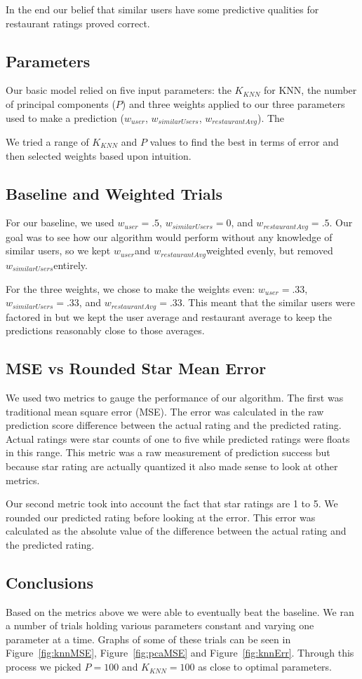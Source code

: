 \documentclass[10pt,twocolumn,letterpaper]{article}
\newcommand{\wu}{\ensuremath{w_{user}}}
\newcommand{\ws}{\ensuremath{w_{similarUsers}}}
\newcommand{\wrst}{\ensuremath{w_{restaurantAvg}}}
\begin{document}
In the end our belief that similar users have some predictive qualities for restaurant ratings proved correct.

\subsection{Parameters}
Our basic model relied on five input parameters: the $K_{KNN}$ for KNN, the number of principal components ($P$) and three weights applied to our three parameters used to make a prediction (\wu, \ws, \wrst). The 

We tried a range of $K_{KNN}$ and $P$ values to find the best in terms of error and then selected weights based upon intuition.

\subsection{Baseline and Weighted Trials}

For our baseline, we used $\wu=.5$, $\ws=0$, and $\wrst=.5$. Our goal was to see how our algorithm would perform without any knowledge of similar users, so we kept \wu and \wrst weighted evenly, but removed \ws entirely.

For the three weights, we chose to make the weights even: $\wu=.33$, $\ws=.33$, and $\wrst=.33$. This meant that the similar users were factored in but we kept the user average and restaurant average to keep the predictions reasonably close to those averages.

\subsection{MSE vs Rounded Star Mean Error}
We used two metrics to gauge the performance of our algorithm. The first was traditional mean square error (MSE). The error was calculated in the raw prediction score difference between the actual rating and the predicted rating. Actual ratings were star counts of one to five while predicted ratings were floats in this range. This metric was a raw measurement of prediction success but because star rating are actually quantized it also made sense to look at other metrics.

Our second metric took into account the fact that star ratings are 1 to 5. We rounded our predicted rating before looking at the error. This error was calculated as the absolute value of the difference between the actual rating and the predicted rating.

\subsection{Conclusions}
Based on the metrics above we were able to eventually beat the baseline. We ran a number of trials holding various parameters constant and varying one parameter at a time. Graphs of some of these trials can be seen in Figure~\ref{fig:knnMSE}, Figure~\ref{fig:pcaMSE} and Figure~\ref{fig:knnErr}. Through this process we picked $P=100$ and $K_{KNN}=100$ as close to optimal parameters.
\end{document}
